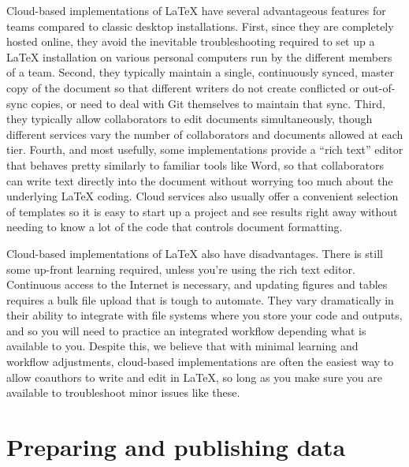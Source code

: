Cloud-based implementations of {\LaTeX} have several advantageous features
for teams compared to classic desktop installations.
First, since they are completely hosted online,
they avoid the inevitable troubleshooting required to set up a {\LaTeX} installation
on various personal computers run by the different members of a team.
Second, they typically maintain a single, continuously synced, master copy of the document
so that different writers do not create conflicted or out-of-sync copies,
or need to deal with Git themselves to maintain that sync.
Third, they typically allow collaborators to edit documents simultaneously,
though different services vary the number of collaborators and documents allowed at each tier.
Fourth, and most usefully, some implementations provide a ``rich text'' editor
that behaves pretty similarly to familiar tools like Word,
so that collaborators can write text directly into the document without worrying too much
about the underlying {\LaTeX} coding.
Cloud services also usually offer a convenient selection of templates
so it is easy to start up a project and see results right away
without needing to know a lot of the code that controls document formatting.

Cloud-based implementations of {\LaTeX} also have disadvantages.
There is still some up-front learning required, unless you're using the rich text editor.
Continuous access to the Internet is necessary,
and updating figures and tables requires a bulk file upload that is tough to automate.
They vary dramatically in their ability to integrate
with file systems where you store your code and outputs,
and so you will need to practice an integrated workflow depending what is available to you.
Despite this, we believe that with minimal learning and workflow adjustments,
cloud-based implementations are often the easiest way to allow coauthors to write and edit in \LaTeX,
so long as you make sure you are available to troubleshoot minor issues like these.


\section{Preparing and publishing data}

